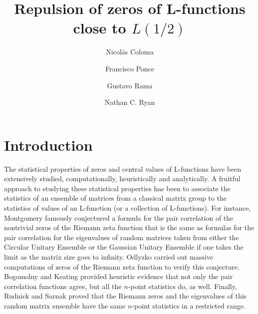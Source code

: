 \documentclass[11pt]{amsart}
\begin{document}
\title{Repulsion of zeros of L-functions close to $L(1/2)$}

\author{Nicol\'as Coloma}
\address{Universidad San Francisco de Quito, Cumbay\'a, Ecuador}

\author{Francisco Ponce}
\address{Universidad San Francisco de Quito, Cumbay\'a, Ecuador}

\author{Gustavo Rama}
\address{Universidad de la Rep\'ublica, Montevideo, Uruguay}

\author{Nathan C. Ryan}
\address{Bucknell University, Lewisburg, Pennsylvania, USA}



\maketitle

\section{Introduction}

The statistical properties of zeros and central values of L-functions have been extensively studied, computationally, heuristically and analytically.  A fruitful approach to studying these statistical properties has been to associate the statistics of an ensemble of matrices from a classical matrix group to the statistics of values of an L-function (or a collection of L-functions).  For instance, Montgomery \cite{montgomery} famously conjectured a formula for the pair correlation of the nontrivial zeros of the Riemann zeta function that is the same as formulas for the pair correlation for the eigenvalues of random matrices taken from either the Circular Unitary Ensemble or the Gaussian Unitary Ensemble if one takes the limit as the matrix size goes to infinity.  Odlyzko \cite{odlyzko} carried out massive computations of zeros of the Riemann zeta function to verify this conjecture.  Bogomolny and Keating \cite{bogomolnykeating1,bogomolnykeating2} provided heuristic evidence that not only the pair correlation functions agree, but all the $n$-point statistics do, as well.  Finally, Rudnick and Sarnak \cite{rudnicksarnak} proved that the Riemann zeros and the eigenvalues of this random matrix ensemble have the same $n$-point statistics in a restricted range.  
\end{document}
